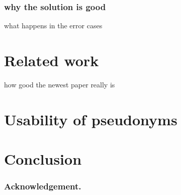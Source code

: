 \documentclass{llncs} %
\begin{document}
\subsubsection{why the solution is good}
what happens in the error cases

\section{Related work}
how good the newest paper really is

\section{Usability of pseudonyms}



\section{Conclusion}
\label{sec:conclusion}


\subsubsection{Acknowledgement.}
\label{sec:acknowledgement}



{}

\begin{thebibliography}{5}



\end{thebibliography}
\end{document}
